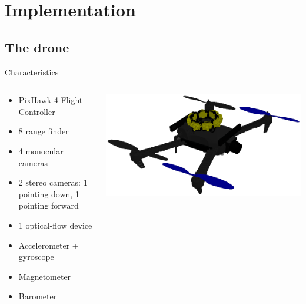 \documentclass[serif,aspectratio=169]{beamer}
\begin{document}
    \section{Implementation}
    \subsection{The drone}
    \begin{frame}{Characteristics}
        \begin{columns}[c]
            \begin{column}{.5\textwidth}
                \begin{itemize}
                    \item{PixHawk 4 Flight Controller}
                    \item{8 range finder}
                    \item{4 monocular cameras}
                    \item{2 stereo cameras: 1 pointing down, 1 pointing forward}
                    \item{1 optical-flow device}
                    \item{Accelerometer + gyroscope}
                    \item{Magnetometer}
                    \item{Barometer}
                \end{itemize}
            \end{column}
            \begin{column}{.5\textwidth}
                \includegraphics[width=\linewidth]{Images/fig28-drone-sim-2.png}
            \end{column}
        \end{columns}
    \end{frame}
\end{document}
